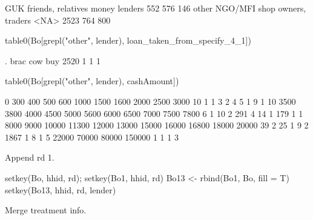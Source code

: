 \begin{Schunk}
\begin{Soutput}
                 GUK   friends, relatives        money lenders 
                 552                  576                  146 
       other NGO/MFI shop owners, traders                 <NA> 
                2523                  764                  800 
\end{Soutput}
\begin{Sinput}
table0(Bo[grepl("other", lender), loan_taken_from_specify_4_1])
\end{Sinput}
\begin{Soutput}

              .    brac cow buy 
   2520       1       1       1 
\end{Soutput}
\begin{Sinput}
table0(Bo[grepl("other", lender), cashAmount])
\end{Sinput}
\begin{Soutput}

     0    300    400    500    600   1000   1500   1600   2000   2500   3000 
    10      1      1      3      2      4      5      1      9      1     10 
  3500   3800   4000   4500   5000   5600   6000   6500   7000   7500   7800 
     6      1     10      2    291      4     14      1    179      1      1 
  8000   9000  10000  11300  12000  13000  15000  16000  16800  18000  20000 
    39      2     25      1      9      2   1867      1      8      1      5 
 22000  70000  80000 150000 
     1      1      1      3 
\end{Soutput}
\end{Schunk}
Append rd 1.
\begin{Schunk}
\begin{Sinput}
setkey(Bo, hhid, rd); setkey(Bo1, hhid, rd)
Bo13 <- rbind(Bo1, Bo, fill = T)
setkey(Bo13, hhid, rd, lender)
\end{Sinput}
\end{Schunk}
Merge treatment info.
